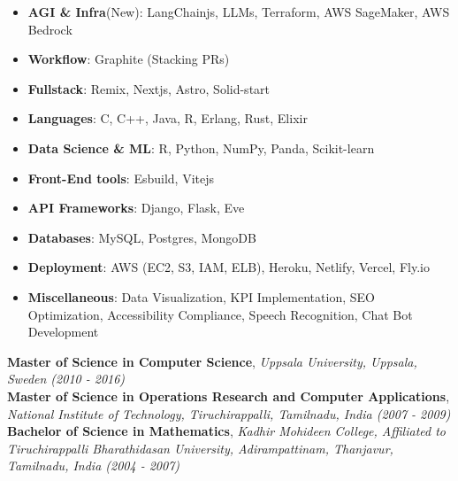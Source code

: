 \newpage
\begin{minipage}[t]{0.29\textwidth} %

\colorbox{cvblue!90}
{\color{white}  %
  \textwidth\relax %
  \begin{minipage}[t][293mm][t]{0.82\textwidth}
  \raggedright
  \vspace*{2.5ex}

  \Large
  \begin{itemize}
      \item \textbf{AGI \& Infra}(New): LangChainjs, LLMs, Terraform, AWS SageMaker, AWS Bedrock
      \item \textbf{Workflow}: Graphite (Stacking PRs)
      \item \textbf{Fullstack}: Remix, Nextjs, Astro, Solid-start
      \item \textbf{Languages}: C, C++, Java, R, Erlang, Rust, Elixir
      \item \textbf{Data Science \& ML}: R, Python, NumPy, Panda, Scikit-learn
      \item \textbf{Front-End tools}: Esbuild, Vitejs
      \item \textbf{API Frameworks}: Django, Flask, Eve
      \item \textbf{Databases}: MySQL, Postgres, MongoDB
      \item \textbf{Deployment}: AWS (EC2, S3, IAM, ELB), Heroku, Netlify, Vercel, Fly.io
      \item \textbf{Miscellaneous}: Data Visualization, KPI Implementation, SEO Optimization, Accessibility Compliance, Speech Recognition, Chat Bot Development
  \end{itemize}

  \Large
  \Large
  \textbf{Master of Science in Computer Science}, \textit{Uppsala University, Uppsala, Sweden (2010 - 2016)}\\
  \vspace{0.5em}
  \textbf{Master of Science in Operations Research and Computer Applications}, \textit{National Institute of Technology, Tiruchirappalli, Tamilnadu, India (2007 - 2009)}\\
  \vspace{0.5em}
  \textbf{Bachelor of Science in Mathematics}, \textit{Kadhir Mohideen College, Affiliated to Tiruchirappalli Bharathidasan University, Adirampattinam, Thanjavur, Tamilnadu, India (2004 - 2007)}\\


\end{minipage}}
\end{minipage}
